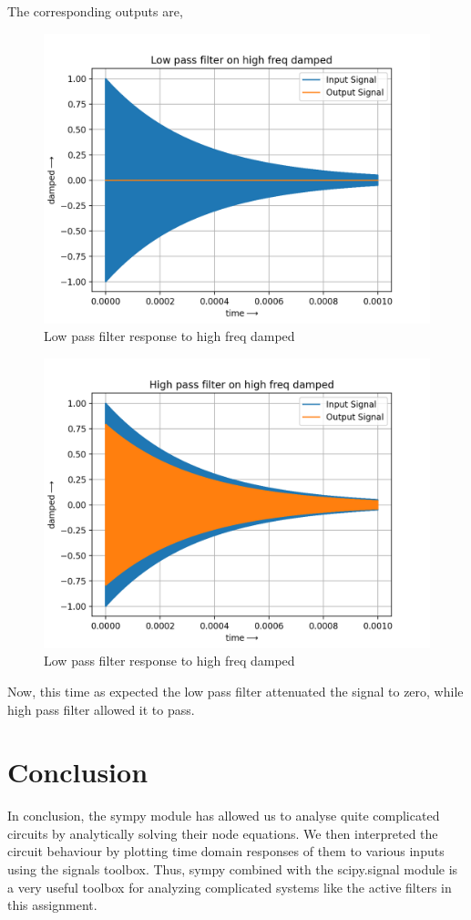 \documentclass[11pt, a4paper]{article}
\begin{document}
The corresponding outputs are,
\begin{figure}[!tbh]
   	\centering
   	\includegraphics[scale=0.5]{low_pass_high_damped.png}   
   	\caption{Low pass filter response to high freq damped}
   	\label{fig:Figure_1}
\end{figure}
\begin{figure}[!tbh]
   	\centering
   	\includegraphics[scale=0.5]{high_pass_high_damped.png}   
   	\caption{Low pass filter response to high freq damped}
   	\label{fig:Figure_1}
\end{figure}
Now, this time as expected the low pass filter attenuated the signal to zero, while high pass filter allowed it to pass.

\newpage
\section{Conclusion}
In conclusion, the sympy module has allowed us to analyse quite complicated circuits by analytically solving their node equations. We then interpreted the circuit behaviour by plotting time domain responses of them to various inputs using the signals toolbox. Thus, sympy combined with the scipy.signal module is a very useful toolbox for analyzing complicated systems like the active filters in this assignment.
\end{document}
